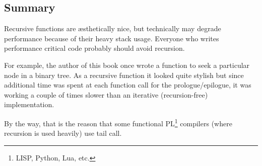 \subsection{Summary}

\label{Recursion_and_tail_call}
\myindex{\Recursion}
Recursive functions are \ae{}sthetically nice, but technically may degrade performance because
of their heavy stack usage.
Everyone who writes performance critical code probably should avoid recursion.

For example, the author of this book once wrote a function to seek a particular node in a binary tree. 
As a recursive function it looked quite stylish but since additional time
was spent at each function call
for the prologue/epilogue, it was working a couple of times slower than an iterative (recursion-free)
implementation.

\newcommand{\FnFP}{\footnote{LISP, Python, Lua, etc.}}

By the way, that is the reason that some functional \ac{PL}\FnFP{} compilers (where recursion is used heavily) use \gls{tail call}.
